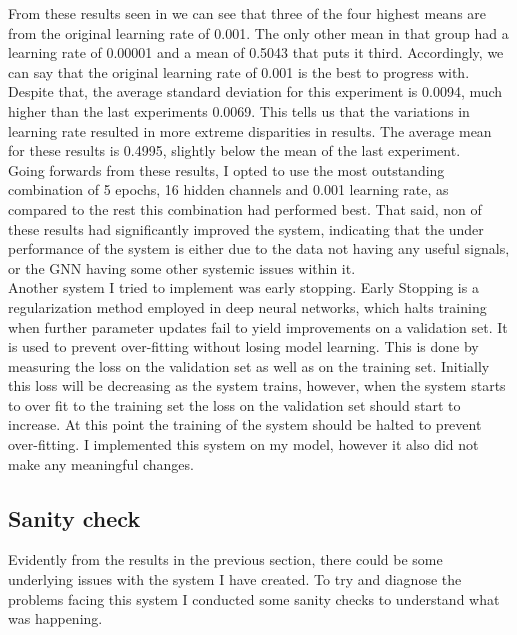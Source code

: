 \documentclass{l4proj}
\begin{document}
From these results seen in  we can see that three of the four highest means are from the original learning rate of 0.001. The only other mean in that group had a learning rate of 0.00001 and a mean of 0.5043 that puts it third. Accordingly, we can say that the original learning rate of 0.001 is the best to progress with. Despite that, the average standard deviation for this experiment is 0.0094, much higher than the last experiments 0.0069. This tells us that the variations in learning rate resulted in more extreme disparities in results. The average mean for these results is 0.4995, slightly below the mean of the last experiment. \\

Going forwards from these results, I opted to use the most outstanding combination of 5 epochs, 16 hidden channels and 0.001 learning rate, as compared to the rest this combination had performed best. That said, non of these results had significantly improved the system, indicating that the under performance of the system is either due to the data not having any useful signals, or the GNN having some other systemic issues within it. \\

Another system I tried to implement was early stopping. Early Stopping is a regularization method employed in deep neural networks, which halts training when further parameter updates fail to yield improvements on a validation set. It is used to prevent over-fitting without losing model learning. This is done by measuring the loss on the validation set as well as on the training set. Initially this loss will be decreasing as the system trains, however, when the system starts to over fit to the training set the loss on the validation set should start to increase. At this point the training of the system should be halted to prevent over-fitting. I implemented this system on my model, however it also did not make any meaningful changes. \\
\subsection{Sanity check}

Evidently from the results in the previous section, there could be some underlying issues with the system I have created. To try and diagnose the problems facing this system I conducted some sanity checks to understand what was happening. \\
\end{document}
